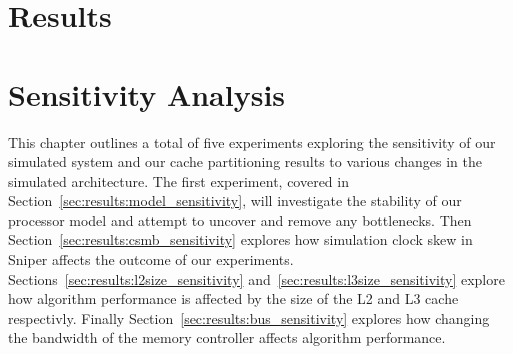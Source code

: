 \chapter{Results}
\label{cpt:results}




\chapter{Sensitivity Analysis}
\label{cpt:sresults}
This chapter outlines a total of five experiments exploring the sensitivity of our simulated system and our cache partitioning results to various changes in the simulated architecture.
The first experiment, covered in Section~\ref{sec:results:model_sensitivity}, will investigate the stability of our processor model and attempt to uncover and remove any bottlenecks.
Then Section~\ref{sec:results:csmb_sensitivity} explores how simulation clock skew in Sniper affects the outcome of our experiments.
Sections~\ref{sec:results:l2size_sensitivity} and~\ref{sec:results:l3size_sensitivity} explore how algorithm performance is affected by the size of the L2 and L3 cache respectivly.
Finally Section~\ref{sec:results:bus_sensitivity} explores how changing the bandwidth of the memory controller affects algorithm performance.










